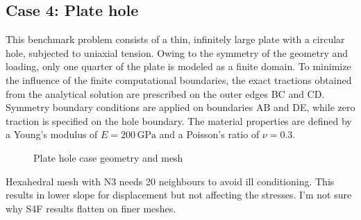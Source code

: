 \documentclass[sn-mathphys,Numbered]{sn-jnl}%
\begin{document}
\subsection{Case 4: Plate hole}
%
This benchmark problem consists of a thin, infinitely large plate with a circular hole, subjected to uniaxial tension. Owing to the symmetry of the geometry and loading, only one quarter of the plate is modeled as a finite domain. To minimize the influence of the finite computational boundaries, the exact tractions obtained from the analytical solution \cite{Demirdzic1997} are prescribed on the outer edges BC and CD. Symmetry boundary conditions are applied on boundaries AB and DE, while zero traction is specified on the hole boundary. The material properties are defined by a Young’s modulus of $E = 200 \,\text{GPa}$ and a Poisson’s ratio of $\nu = 0.3$.
%
\begin{figure}[H]
 	\centering
 	\caption{Plate hole case geometry and mesh}
 	\label{fig:plateHole}
\end{figure}
%
Hexahedral mesh with N3 needs 20 neighbours to avoid ill conditioning. This results in lower slope for displacement but not affecting the stresses. I'm not sure why S4F results flatten on finer meshes.
%
\end{document}
